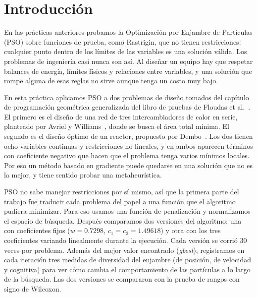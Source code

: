 \setcounter{page}{1}

\section{Introducción}

En las prácticas anteriores probamos la Optimización por Enjambre de Partículas (PSO) sobre funciones de prueba, como Rastrigin, que no tienen restricciones: cualquier punto dentro de los límites de las variables es una solución válida. Los problemas de ingeniería casi nunca son así. Al diseñar un equipo hay que respetar balances de energía, límites físicos y relaciones entre variables, y una solución que rompe alguna de esas reglas no sirve aunque tenga un costo muy bajo.

En esta práctica aplicamos PSO a dos problemas de diseño tomados del capítulo de programación geométrica generalizada del libro de pruebas de Floudas et al.~\cite{floudas1999handbook}. El primero es el diseño de una red de tres intercambiadores de calor en serie, planteado por Avriel y Williams~\cite{avriel1971extension}, donde se busca el área total mínima. El segundo es el diseño óptimo de un reactor, propuesto por Dembo~\cite{dembo1976set}. Los dos tienen ocho variables continuas y restricciones no lineales, y en ambos aparecen términos con coeficiente negativo que hacen que el problema tenga varios mínimos locales. Por eso un método basado en gradiente puede quedarse en una solución que no es la mejor, y tiene sentido probar una metaheurística.

PSO no sabe manejar restricciones por sí mismo, así que la primera parte del trabajo fue traducir cada problema del papel a una función que el algoritmo pudiera minimizar. Para eso usamos una función de penalización y normalizamos el espacio de búsqueda. Después comparamos dos versiones del algoritmo: una con coeficientes fijos ($w = 0.7298$, $c_1 = c_2 = 1.49618$) y otra con los tres coeficientes variando linealmente durante la ejecución. Cada versión se corrió 30 veces por problema. Además del mejor valor encontrado (\textit{gbest}), registramos en cada iteración tres medidas de diversidad del enjambre (de posición, de velocidad y cognitiva) para ver cómo cambia el comportamiento de las partículas a lo largo de la búsqueda. Las dos versiones se compararon con la prueba de rangos con signo de Wilcoxon.
